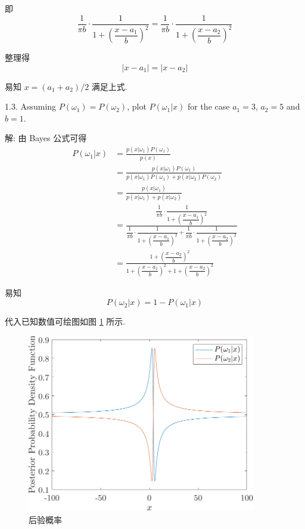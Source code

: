 \documentclass[openany]{ctexbook}
\theoremstyle{kaiti}
\theoremstyle{normal}
\begin{document}
即
\begin{equation}
  \frac{1}{\pi b} \cdot \frac{1}{1+\left(\dfrac{x-a_1}{b}\right)^2}=\frac{1}{\pi b} \cdot \frac{1}{1+\left(\dfrac{x-a_2}{b}\right)^2}
\end{equation}

整理得
\begin{equation}
  |x-a_1|=|x-a_2|
\end{equation}

易知 $x=(a_1+a_2)/2$ 满足上式.

1.3. Assuming $P(\omega_1) = P(\omega_2)$, plot $P(\omega_1|x)$ for the case $a_1=3$, $a_2=5$ and $b=1$.

解: 由 Bayes 公式可得
\begin{equation}
  \begin{aligned}
    P(\omega_1|x)
    &=\frac{p(x|\omega_1)P(\omega_1)}{p(x)}\\
    &=\frac{p(x|\omega_1)P(\omega_1)}{p(x|\omega_1)P(\omega_1)+p(x|\omega_2)P(\omega_2)}\\
    &=\frac{p(x|\omega_1)}{p(x|\omega_1)+p(x|\omega_2)}\\
    &=\frac{\dfrac{1}{\pi b} \cdot \dfrac{1}{1+\left(\dfrac{x-a_1}{b}\right)^2}}{\dfrac{1}{\pi b} \cdot \dfrac{1}{1+\left(\dfrac{x-a_1}{b}\right)^2}+\dfrac{1}{\pi b} \cdot \dfrac{1}{1+\left(\dfrac{x-a_2}{b}\right)^2}}\\
    &=\frac{1+\left(\dfrac{x-a_2}{b}\right)^2}{1+\left(\dfrac{x-a_1}{b}\right)^2+1+\left(\dfrac{x-a_2}{b}\right)^2}
  \end{aligned}
  \label{eq:postpdf}
\end{equation}

易知
\begin{equation}
  P(\omega_2|x)=1-P(\omega_1|x)
\end{equation}

代入已知数值可绘图如图 \ref{fig:postpdf} 所示.

\begin{figure}
  \centering
  \includegraphics[width=10cm]{postpdf.pdf}
  \caption{后验概率}
  \label{fig:postpdf}
\end{figure}
\end{document}
